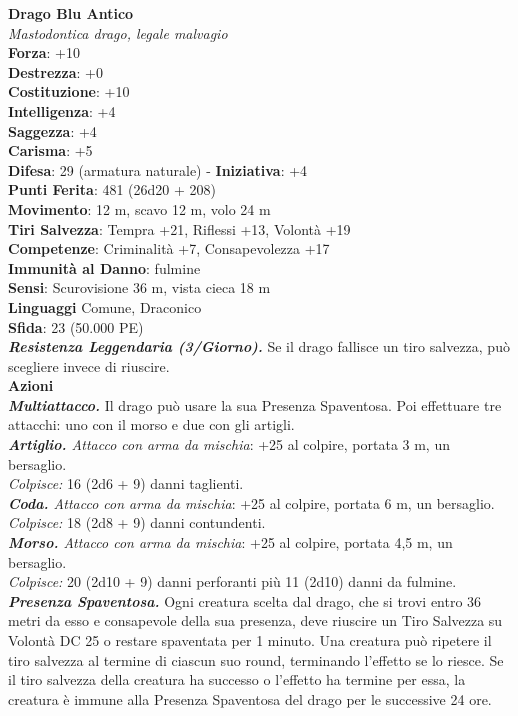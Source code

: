 \begin{multicols}{2}
\medskip\textbf{Drago Blu Antico}\\
\emph{Mastodontica drago, legale malvagio}\\
\textbf{Forza}: +10\\
\textbf{Destrezza}: +0\\
\textbf{Costituzione}: +10\\
\textbf{Intelligenza}: +4\\
\textbf{Saggezza}: +4\\
\textbf{Carisma}: +5\\	
\textbf{Difesa}: 29 (armatura naturale) - \textbf{Iniziativa}: +4\\
\textbf{Punti Ferita}: 481 (26d20 + 208)\\
\textbf{Movimento}: 12 m, scavo 12 m, volo 24 m\\
\textbf{Tiri Salvezza}: Tempra +21, Riflessi +13, Volontà +19\\
\textbf{Competenze}: Criminalità +7, Consapevolezza +17\\
\textbf{Immunità al Danno}: fulmine\\
\textbf{Sensi}: Scurovisione 36 m, vista cieca 18 m\\
\textbf{Linguaggi} Comune, Draconico\\
\textbf{Sfida}: 23 (50.000 PE)\smallskip\\
\emph{\textbf{Resistenza Leggendaria (3/Giorno).}} Se il drago fallisce un tiro salvezza, può scegliere invece di riuscire. \\
\smallskip\textbf{Azioni}\\
\emph{\textbf{Multiattacco.}} Il drago può usare la sua Presenza Spaventosa. Poi effettuare tre attacchi: uno con il morso e due con gli artigli.\\
\emph{\textbf{Artiglio.} Attacco con arma da mischia}: +25 al colpire, portata 3 m, un bersaglio.\\
\emph{Colpisce:} 16 (2d6 + 9) danni taglienti.\\
\emph{\textbf{Coda.} Attacco con arma da mischia}: +25 al colpire, portata 6 m, un bersaglio.\\
\emph{Colpisce:} 18 (2d8 + 9) danni contundenti.\\
\emph{\textbf{Morso.} Attacco con arma da mischia}: +25 al colpire, portata 4,5 m, un bersaglio.\\
\emph{Colpisce:} 20 (2d10 + 9) danni perforanti più 11 (2d10) danni da fulmine.\\
\emph{\textbf{Presenza Spaventosa.}} Ogni creatura scelta dal drago, che si trovi entro 36 metri da esso e consapevole della sua presenza, deve riuscire un Tiro Salvezza su Volontà DC  25 o restare spaventata per 1 minuto. Una creatura può ripetere il tiro salvezza al termine di ciascun suo round, terminando l'effetto se lo riesce. Se il tiro salvezza della creatura ha successo o l'effetto ha termine per essa, la creatura è immune alla Presenza Spaventosa del drago per le successive 24 ore.\\

\end{multicols}
